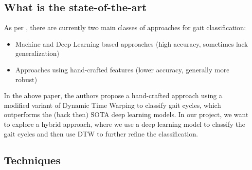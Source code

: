 \documentclass[a4paper,10pt]{article}
\begin{document}
\subsection{What is the state-of-the-art}
As per \cite{AVOLA2024103643}, there are currently two main classes of approaches for gait classification: \begin{itemize}
    \item Machine and Deep Learning based approaches (high accuracy, sometimes lack generalization)
    \item Approaches using hand-crafted features (lower accuracy, generally more robust)
\end{itemize}
In the above paper, the authors propose a hand-crafted approach using a modified variant of Dynamic Time Warping to classify gait cycles, which outperforms the (back then) SOTA deep learning models.
In our project, we want to explore a hybrid approach, where we use a deep learning model to classify the gait cycles and then use DTW to further refine the classification.

\subsection{Techniques}
\end{document}

